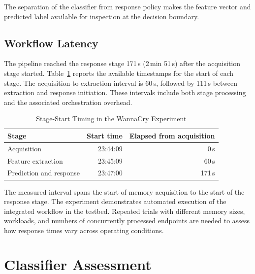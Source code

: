 \documentclass[conference]{IEEEtran}
\begin{document}
The separation of the classifier from response policy makes the feature vector and predicted label available for inspection at the decision boundary.

\subsection{Workflow Latency}
The pipeline reached the response stage 171\,s (2\,min 51\,s) after the acquisition stage started. Table~\ref{tab:timing} reports the available timestamps for the start of each stage. The acquisition-to-extraction interval is 60\,s, followed by 111\,s between extraction and response initiation. These intervals include both stage processing and the associated orchestration overhead.

\begin{table}[t]
\caption{Stage-Start Timing in the WannaCry Experiment}
\label{tab:timing}
\centering
\small
\begin{tabular}{@{}lrr@{}}
\toprule
Stage & Start time & Elapsed from acquisition \\
\midrule
Acquisition & 23:44:09 & 0\,s \\
Feature extraction & 23:45:09 & 60\,s \\
Prediction and response & 23:47:00 & 171\,s \\
\bottomrule
\end{tabular}
\par\smallskip
\begin{minipage}{\columnwidth}\footnotesize
\end{minipage}
\end{table}

The measured interval spans the start of memory acquisition to the start of the response stage.
The experiment demonstrates automated execution of the integrated workflow in the testbed. Repeated trials with different memory sizes, workloads, and numbers of concurrently processed endpoints are
needed to assess how response times vary across operating conditions.

\section{Classifier Assessment}
\label{sec:assessment}
\end{document}
